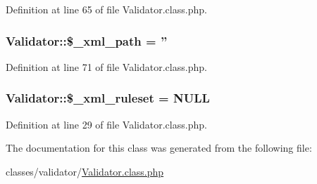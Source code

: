 Definition at line 65 of file Validator.\+class.\+php.

\hypertarget{classValidator_a69a5bdd50a59f7d9daab2ea702036277}{
\subsubsection[{\$\+\_\+xml\+\_\+path}]{\setlength{\rightskip}{0pt plus 5cm}Validator\+::\$\+\_\+xml\+\_\+path = ''}}\label{classValidator_a69a5bdd50a59f7d9daab2ea702036277}


Definition at line 71 of file Validator.\+class.\+php.

\hypertarget{classValidator_a45a0aaa905493683be7fc01a80837a26}{
\subsubsection[{\$\+\_\+xml\+\_\+ruleset}]{\setlength{\rightskip}{0pt plus 5cm}Validator\+::\$\+\_\+xml\+\_\+ruleset = N\+U\+L\+L}}\label{classValidator_a45a0aaa905493683be7fc01a80837a26}


Definition at line 29 of file Validator.\+class.\+php.



The documentation for this class was generated from the following file\+:\begin{DoxyCompactItemize}
\item 
classes/validator/\hyperlink{Validator_8class_8php}{Validator.\+class.\+php}\end{DoxyCompactItemize}
